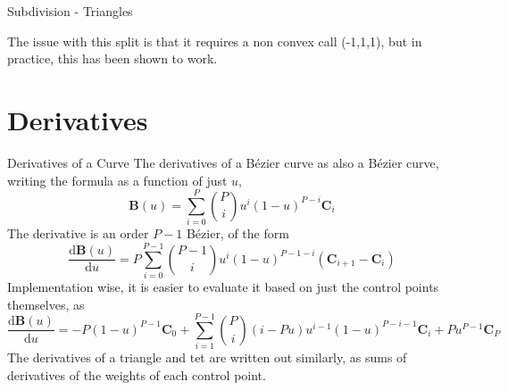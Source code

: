 \documentclass[12pt]{beamer}
\begin{document}
\begin{frame}{Subdivision - Triangles}
\begin{figure}
\end{figure}
The issue with this split is that it requires a non convex call (-1,1,1), but in practice, this has been shown to work.
\end{frame}
\section{Derivatives}
\begin{frame}{Derivatives of a Curve}
The derivatives of a B{\'e}zier curve as also a B{\'e}zier curve, writing the formula as a function of just $u$,
\[ \mathbf{B}(u) = \displaystyle \sum_{i=0}^{P} {P \choose i}u^i(1-u)^{P-i}\mathbf{C}_{i}   \]
The derivative is an order $P-1$ B{\'e}zier, of the form 
\[
\frac{\mathrm{d} \mathbf{B}(u)}{\mathrm{d} u} = P \displaystyle\sum_{i=0}^{P-1}  {P-1 \choose i}u^i(1-u)^{P-1-i}(\mathbf{C}_{i+1}-\mathbf{C}_i)
\]
Implementation wise, it is easier to evaluate it based on just the control points themselves, as
{
  \footnotesize
\[
\frac{\mathrm{d} \mathbf{B}(u)}{\mathrm{d} u} = -P(1-u)^{P-1}\mathbf{C}_0+\displaystyle \sum_{i=1}^{P-1} {P \choose i}(i-Pu)u^{i-1}(1-u)^{P-i-1}\mathbf{C}_i + Pu^{P-1}\mathbf{C}_P
\]
}
The derivatives of a triangle and tet are written out similarly, as sums of derivatives of the weights of each control point.
\end{frame}
\end{document}
